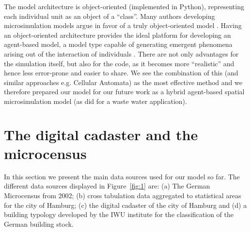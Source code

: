 \documentclass[11pt]{IJM-article}
\begin{document}
The model architecture is object-oriented (implemented in Python), representing
each individual unit as an object of a ``class''. Many authors developing
microsimulation models argue in favor of a truly object-oriented model
. Having an object-oriented
architecture provides the ideal platform for developing an agent-based model, a
model type capable of generating emergent phenomena arising out of the
interaction of individuals . There are not only advantages
for the simulation itself, but also for the code, as it becomes more
``realistic'' and hence less error-prone and easier to share. We see the
combination of this (and similar approaches e.g. Cellular Automata) as the most
effective method and we therefore prepared our model for our future work as a
hybrid agent-based spatial microsimulation model (as did 
for a waste water application).

\section{The digital cadaster and the microcensus}
\label{sec:3}

In this section we present the main data sources used for our model so far. The
different data sources displayed in Figure~\ref{fig:1} are: (a) The German
Microcensus from 2002; (b) cross tabulation data aggregated to statistical
areas for the city of Hamburg; (c) the digital cadaster of the city of Hamburg
and (d) a building typology developed by the IWU institute for the
classification of the German building stock.
\end{document}

